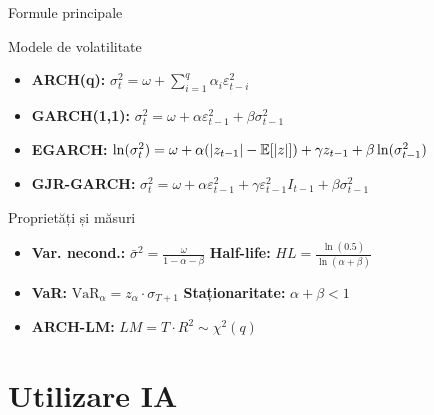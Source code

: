 \documentclass[9pt, aspectratio=169, t]{beamer}
\begin{document}
\begin{frame}{Formule principale}
    \small
        \begin{block}{Modele de volatilitate}
            \begin{itemize}
                \item \textbf{ARCH(q):} $\sigma_t^2 = \omega + \sum_{i=1}^{q} \alpha_i \varepsilon_{t-i}^2$
                \item \textbf{GARCH(1,1):} $\sigma_t^2 = \omega + \alpha \varepsilon_{t-1}^2 + \beta \sigma_{t-1}^2$
                \item \textbf{EGARCH:} $\ln(\sigma_t^2) = \omega + \alpha(|z_{t-1}| - \mathbb{E}[|z|]) + \gamma z_{t-1} + \beta \ln(\sigma_{t-1}^2)$
                \item \textbf{GJR-GARCH:} $\sigma_t^2 = \omega + \alpha \varepsilon_{t-1}^2 + \gamma \varepsilon_{t-1}^2 I_{t-1} + \beta \sigma_{t-1}^2$
            \end{itemize}
        \end{block}

        \begin{block}{Proprietăți și măsuri}
            \begin{itemize}
                \item \textbf{Var. necond.:} $\bar{\sigma}^2 = \frac{\omega}{1-\alpha-\beta}$ \quad \textbf{Half-life:} $HL = \frac{\ln(0.5)}{\ln(\alpha+\beta)}$
                \item \textbf{VaR:} $\text{VaR}_\alpha = z_\alpha \cdot \sigma_{T+1}$ \quad \textbf{Staționaritate:} $\alpha + \beta < 1$
                \item \textbf{ARCH-LM:} $LM = T \cdot R^2 \sim \chi^2(q)$
            \end{itemize}
        \end{block}
\end{frame}


\section{Utilizare IA}
\end{document}

